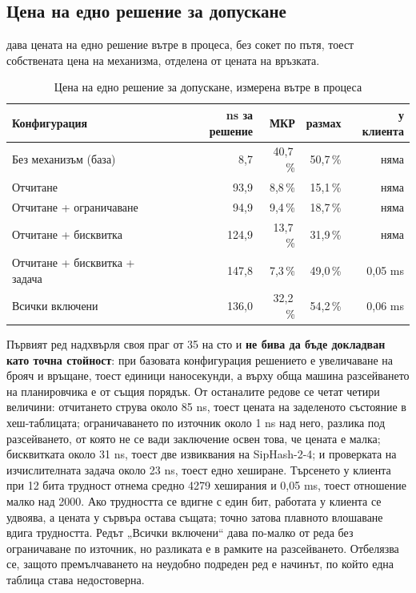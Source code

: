 \subsection{Цена на едно решение за допускане}
\label{subsec:res_decision}

 дава цената на едно решение вътре в процеса, без сокет по пътя, тоест
собствената цена на механизма, отделена от цената на връзката.

\begin{table}[htbp]
\caption{Цена на едно решение за допускане, измерена вътре в процеса}
\label{tab:decision}
\centering
\fontsize{11}{13}\selectfont
\begin{tabular}{L{5.6cm} r r r r}
\toprule
Конфигурация & ns за решение & МКР & размах & у клиента \\
\midrule
Без механизъм (база) & 8,7 & 40,7\,\% & 50,7\,\% & няма \\
Отчитане & 93,9 & 8,8\,\% & 15,1\,\% & няма \\
Отчитане + ограничаване & 94,9 & 9,4\,\% & 18,7\,\% & няма \\
Отчитане + бисквитка & 124,9 & 13,7\,\% & 31,9\,\% & няма \\
Отчитане + бисквитка + задача & 147,8 & 7,3\,\% & 49,0\,\% & 0,05 ms \\
Всички включени & 136,0 & 32,2\,\% & 54,2\,\% & 0,06 ms \\
\bottomrule
\end{tabular}
\end{table}

Първият ред надхвърля своя праг от 35 на сто и \textbf{не бива да бъде докладван като точна
стойност}: при базовата конфигурация решението е увеличаване на брояч и връщане, тоест единици
наносекунди, а върху обща машина разсейването на планировчика е от същия порядък. От останалите
редове се четат четири величини:
отчитането струва около 85 ns, тоест цената на заделеното състояние в хеш-таблицата;
ограничаването по източник около 1 ns над него, разлика под разсейването, от която не се вади
заключение освен това, че цената е малка; бисквитката около 31 ns, тоест две извиквания на
SipHash-2-4; и проверката на изчислителната задача около 23 ns, тоест едно хеширане. Търсенето у
клиента при 12 бита трудност отнема средно 4279 хеширания и 0,05 ms, тоест отношение малко над
2000. Ако трудността се вдигне с един бит, работата у клиента се удвоява, а цената у сървъра
остава същата; точно затова плавното влошаване вдига трудността. Редът „Всички включени“ дава
по-малко от реда без ограничаване по източник, но разликата е в рамките на разсейването.
Отбелязва се, защото премълчаването на неудобно подреден ред е начинът, по който една таблица
става недостоверна.

